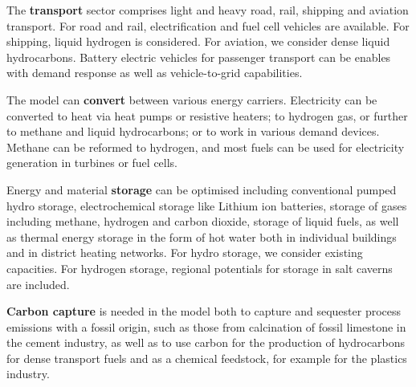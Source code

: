 The \textbf{transport} sector comprises light and heavy road, rail, shipping and
aviation transport. For road and rail, electrification and fuel cell vehicles are
available. For shipping, liquid hydrogen is considered. For aviation, we
consider dense liquid hydrocarbons. Battery electric vehicles for passenger
transport can be enables with demand response as well as vehicle-to-grid
capabilities.

The model can \textbf{convert} between various energy carriers. Electricity can
be converted to heat via heat pumps or resistive heaters; to hydrogen gas, or
further to methane and liquid hydrocarbons; or to work in various demand
devices. Methane can be reformed to hydrogen, and most fuels can be used for
electricity generation in turbines or fuel cells.

Energy and material \textbf{storage} can be optimised including conventional
pumped hydro storage, electrochemical storage like Lithium ion batteries,
storage of gases including methane, hydrogen and carbon dioxide, storage of
liquid fuels, as well as thermal energy storage in the form of hot water both in
individual buildings and in district heating networks. For hydro storage, we
consider existing capacities. For hydrogen storage, regional potentials for
storage in salt caverns are included.

\textbf{Carbon capture} is needed in the model both to capture and sequester
process emissions with a fossil origin, such as those from calcination of fossil
limestone in the cement industry, as well as to use carbon for the
production of hydrocarbons for dense transport fuels and as a chemical
feedstock, for example for the plastics industry.